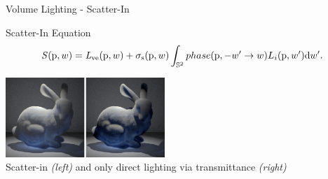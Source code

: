 \documentclass[10pt,compress,professionalfont]{beamer}
\begin{document}
\begin{frame}{Volume Lighting - Scatter-In}

    \begin{block}{Scatter-In Equation}
        \[
            \mathit{S}(\textup{p},w) = \mathit{L}_{\textup{ve}}(\textup{p},w) + \sigma_{\textup{s}}(\textup{p}, w) \int_{\mathbb{S}^2} phase(\textup{p}, -w' \to w) L_{i}(\textup{p},w')\textup{d}w'.
        \]
    \end{block}
    {\centering
    \vspace{8mm}
    \includegraphics[width=60mm]{../img/inscat_comp}\\
    {\centering\scriptsize Scatter-in \textit{(left)} and only direct lighting via transmittance \textit{(right)}\\}
    }

\end{frame}
\end{document}

